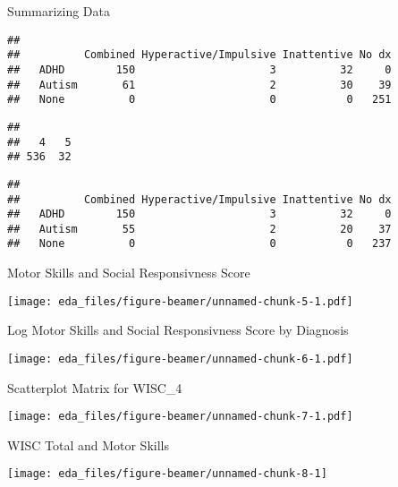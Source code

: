 \documentclass[12pt,ignorenonframetext,aspectratio=169]{beamer}
\begin{document}
\begin{frame}[fragile]{Summarizing Data}
\protect\hypertarget{summarizing-data}{}

\tiny

\begin{verbatim}
##         
##          Combined Hyperactive/Impulsive Inattentive No dx
##   ADHD        150                     3          32     0
##   Autism       61                     2          30    39
##   None          0                     0           0   251
\end{verbatim}

\begin{verbatim}
## 
##   4   5 
## 536  32
\end{verbatim}

\begin{verbatim}
##         
##          Combined Hyperactive/Impulsive Inattentive No dx
##   ADHD        150                     3          32     0
##   Autism       55                     2          20    37
##   None          0                     0           0   237
\end{verbatim}

\normalsize

\end{frame}

\begin{frame}{Motor Skills and Social Responsivness Score}
\protect\hypertarget{motor-skills-and-social-responsivness-score}{}

\texttt{[image: eda\_files/figure-beamer/unnamed-chunk-5-1.pdf]}

\end{frame}

\begin{frame}{Log Motor Skills and Social Responsivness Score by
Diagnosis}
\protect\hypertarget{log-motor-skills-and-social-responsivness-score-by-diagnosis}{}

\texttt{[image: eda\_files/figure-beamer/unnamed-chunk-6-1.pdf]}

\end{frame}

\begin{frame}{Scatterplot Matrix for WISC\_4}
\protect\hypertarget{scatterplot-matrix-for-wisc_4}{}

\texttt{[image: eda\_files/figure-beamer/unnamed-chunk-7-1.pdf]}

\end{frame}

\begin{frame}{WISC Total and Motor Skills}
\protect\hypertarget{wisc-total-and-motor-skills}{}

\begin{center}\texttt{[image: eda\_files/figure-beamer/unnamed-chunk-8-1]} \end{center}

\end{frame}
\end{document}
